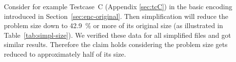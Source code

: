 %

Consider for example Testcase~C (Appendix \ref{sec:tcC}) in the basic encoding
introduced in Section~\ref{sec:enc-original}. Then simplification will reduce the problem
size down to 42.9~\% or more of its original size (as illustrated in Table~\ref{tab:simpl-size}).
We verified these data for all simplified files and got similar results.
Therefore the claim holds considering the problem size gets reduced to
approximately half of its size.

